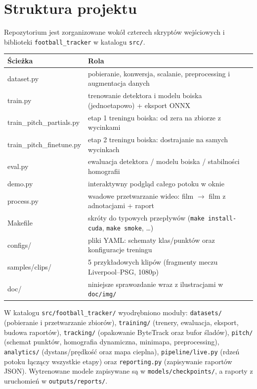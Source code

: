 \documentclass[11pt,a4paper]{article}
\begin{document}
\section{Struktura projektu}

Repozytorium jest zorganizowane wokół czterech skryptów wejściowych i biblioteki
\texttt{football\_tracker} w katalogu \texttt{src/}.

\begin{center}
\small
\begin{tabular}{>{\ttfamily}l p{10.2cm}}
\toprule
\normalfont Ścieżka & Rola \\
\midrule
dataset.py                & pobieranie, konwersja, scalanie, preprocessing i augmentacja danych \\
train.py                  & trenowanie detektora i modelu boiska (jednoetapowo) + eksport ONNX \\
train\_pitch\_partials.py  & etap 1 treningu boiska: od zera na zbiorze z wycinkami \\
train\_pitch\_finetune.py  & etap 2 treningu boiska: dostrajanie na samych wycinkach \\
eval.py                   & ewaluacja detektora / modelu boiska / stabilności homografii \\
demo.py                   & interaktywny podgląd całego potoku w oknie \\
process.py                & wsadowe przetwarzanie wideo: film $\rightarrow$ film z adnotacjami + raport \\
Makefile                  & skróty do typowych przepływów (\texttt{make install-cuda}, \texttt{make smoke}, \ldots) \\
configs/                  & pliki YAML: schematy klas/punktów oraz konfiguracje treningu \\
samples/clips/            & 5 przykładowych klipów (fragmenty meczu Liverpool--PSG, 1080p) \\
doc/                      & niniejsze sprawozdanie wraz z ilustracjami w \texttt{doc/img/} \\
\bottomrule
\end{tabular}
\end{center}

W katalogu \texttt{src/football\_tracker/} wyodrębniono moduły: \texttt{datasets/}
(pobieranie i przetwarzanie zbiorów), \texttt{training/} (trenery, ewaluacja,
eksport, budowa raportów), \texttt{tracking/} (opakowanie ByteTrack oraz bufor
śladów), \texttt{pitch/} (schemat punktów, homografia dynamiczna, minimapa,
preprocessing), \texttt{analytics/} (dystans/prędkość oraz mapa cieplna),
\texttt{pipeline/live.py} (rdzeń potoku łączący wszystkie etapy) oraz
\texttt{reporting.py} (zapisywanie raportów JSON). Wytrenowane modele zapisywane
są w \texttt{models/checkpoints/}, a raporty z uruchomień w \texttt{outputs/reports/}.
\end{document}
